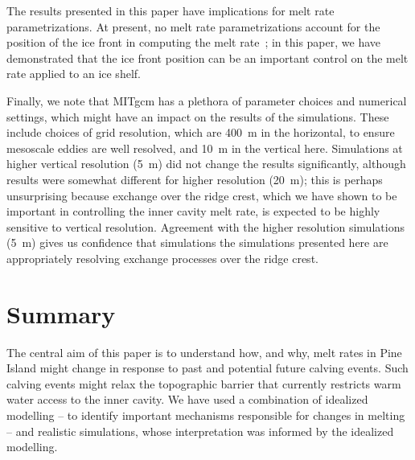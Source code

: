 \documentclass[draft]{agujournal2019}
\begin{document}
The results presented in this paper have implications for melt rate parametrizations. At present, no melt rate parametrizations account for the position of the ice front in computing the melt rate~\cite{AsayDavis2017CurrClimChRep}; in this paper, we have demonstrated that the ice front position can be an important control on the melt rate applied to an ice shelf. %

Finally, we note that MITgcm has a plethora of parameter choices and numerical settings, which might have an impact on the results of the simulations. These include choices of grid resolution, which are 400~m in the horizontal, to ensure mesoscale eddies are well resolved, and 10~m in the vertical here. Simulations at higher vertical resolution (5~m) did not change the results significantly, although results were somewhat different for higher resolution (20~m); this is perhaps unsurprising because exchange over the ridge crest, which we have shown to be important in controlling the inner cavity melt rate, is expected to be highly sensitive to vertical resolution. Agreement with the higher resolution simulations (5~m) gives us confidence that simulations the simulations presented here are appropriately resolving exchange processes over the ridge crest. 

\section{Summary}\label{S:Summary}
The central aim of this paper is to understand how, and why, melt rates in Pine Island might change in response to past and potential future calving events. Such calving events might relax the topographic barrier that currently restricts warm water access to the inner cavity. We have used a combination of idealized modelling -- to identify important mechanisms responsible for changes in melting -- and realistic simulations, whose interpretation was informed by the idealized modelling.
\end{document}
